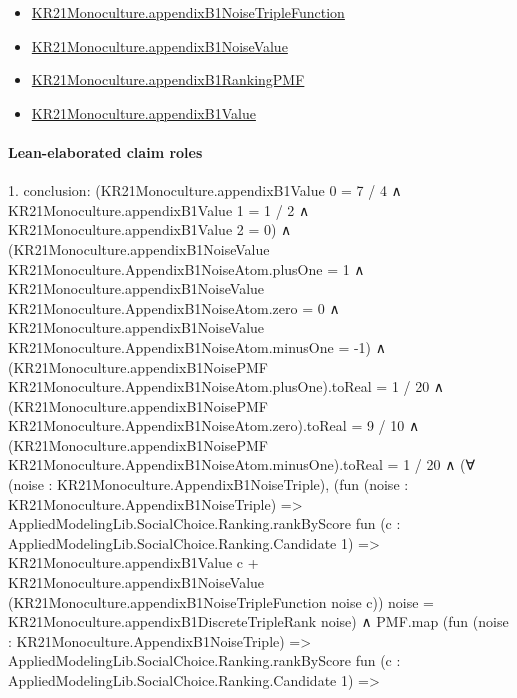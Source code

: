 \documentclass[10pt]{article}
\begin{document}
\begin{itemize}
\item \hyperlink{governing-declaration-c73f18d8ae75d762}{KR21\allowbreak{}Monoculture.\allowbreak{}appendix\allowbreak{}B1\allowbreak{}Noise\allowbreak{}Triple\allowbreak{}Function}
\item \hyperlink{governing-declaration-6e19dd667db2a775}{KR21\allowbreak{}Monoculture.\allowbreak{}appendix\allowbreak{}B1\allowbreak{}Noise\allowbreak{}Value}
\item \hyperlink{governing-declaration-6296df10f5bc0621}{KR21\allowbreak{}Monoculture.\allowbreak{}appendix\allowbreak{}B1\allowbreak{}Ranking\allowbreak{}PMF}
\item \hyperlink{governing-declaration-c2461f284c18c0e0}{KR21\allowbreak{}Monoculture.\allowbreak{}appendix\allowbreak{}B1\allowbreak{}Value}
\end{itemize}
\paragraph{Lean-elaborated claim roles}\begin{ReviewVerbatim}
1. conclusion: (KR21Monoculture.appendixB1Value 0 = 7 / 4 ∧
    KR21Monoculture.appendixB1Value 1 = 1 / 2 ∧ KR21Monoculture.appendixB1Value 2 = 0) ∧
  (KR21Monoculture.appendixB1NoiseValue KR21Monoculture.AppendixB1NoiseAtom.plusOne = 1 ∧
      KR21Monoculture.appendixB1NoiseValue KR21Monoculture.AppendixB1NoiseAtom.zero = 0 ∧
        KR21Monoculture.appendixB1NoiseValue KR21Monoculture.AppendixB1NoiseAtom.minusOne = -1) ∧
    (KR21Monoculture.appendixB1NoisePMF KR21Monoculture.AppendixB1NoiseAtom.plusOne).toReal = 1 / 20 ∧
      (KR21Monoculture.appendixB1NoisePMF KR21Monoculture.AppendixB1NoiseAtom.zero).toReal = 9 / 10 ∧
        (KR21Monoculture.appendixB1NoisePMF KR21Monoculture.AppendixB1NoiseAtom.minusOne).toReal = 1 / 20 ∧
          (∀ (noise : KR21Monoculture.AppendixB1NoiseTriple),
              (fun (noise : KR21Monoculture.AppendixB1NoiseTriple) =>
                    AppliedModelingLib.SocialChoice.Ranking.rankByScore
                      fun (c : AppliedModelingLib.SocialChoice.Ranking.Candidate 1) =>
                      KR21Monoculture.appendixB1Value c +
                        KR21Monoculture.appendixB1NoiseValue (KR21Monoculture.appendixB1NoiseTripleFunction noise c))
                  noise =
                KR21Monoculture.appendixB1DiscreteTripleRank noise) ∧
            PMF.map
                  (fun (noise : KR21Monoculture.AppendixB1NoiseTriple) =>
                    AppliedModelingLib.SocialChoice.Ranking.rankByScore
                      fun (c : AppliedModelingLib.SocialChoice.Ranking.Candidate 1) =>

\end{ReviewVerbatim}
\end{document}
